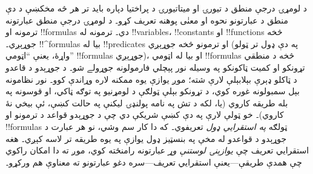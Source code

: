 \documentclass[../../../include/open-logic-section]{subfiles}
\begin{document}


د لومړۍ درجې منطق د تيورۍ او ميتاتيورۍ د پراختيا دپاره بايد تر هر څه
مخکښې د دې منطق د عبارتونو نحوه او معنٰی پوهنه تعريف کړو۔ د لومړۍ درجې
منطق عبارتونه ترمونه او !!{formula}s دي۔ ترمونه له !!{variable}s،
!!{constant}s او !!{function}s څخه جوړېږي۔ !!^{formula}s بيا له
!!{predicate}s او ترمونو څخه جوړېږي (په دې ډول تر ټولو واړۀ، يعنې
``اټومي'' !!{formula}s جوړېږي)، او بيا له اټومي !!{formula}s څخه د
منطقي تړونکو او کميت ټاکونکو په وسيله نور پېچلي فارمولونه جوړولے شو۔ د
جوړېدو د قاعدو د ټاکلو ډېرې بېلابېلې لارې شته؛ موږ يوازې يوه ممکنه لاره
وړاندې کوو۔ نور نظامونه بېل سمبولونه غوره کوي، د تړونکو بېلې ټولګې د
لومړنيو په توګه ټاکي، او قوسونه په بله طريقه کاروي (يا، لکه د تش په نامه
پولنډۍ ليکنې په حالت کښې، ئې بيخي نۀ کاروي)۔ خو ټولې لارې په دې کښې
شريکې دي چې د جوړېدو قواعد د ترمونو او !!{formula}s ټولګه
\emph{په استقرايي ډول} تعريفوي۔ که دا کار سم وشي، نو هر عبارت د جوړېدو
د قواعدو له مخې په بنسټيز ډول يوازې په يوه طريقه تر لاسه کېږي۔ هغه
استقرايي تعريف چې \emph{يوازېنۍ لوستنې وړ} عبارتونه رامنځته کوي، موږ ته
دا امکان راکوي چې همدې طريقې---يعنې استقرايي تعريف---سره دغو عبارتونو ته
معناوې هم ورکړو۔
\end{document}
